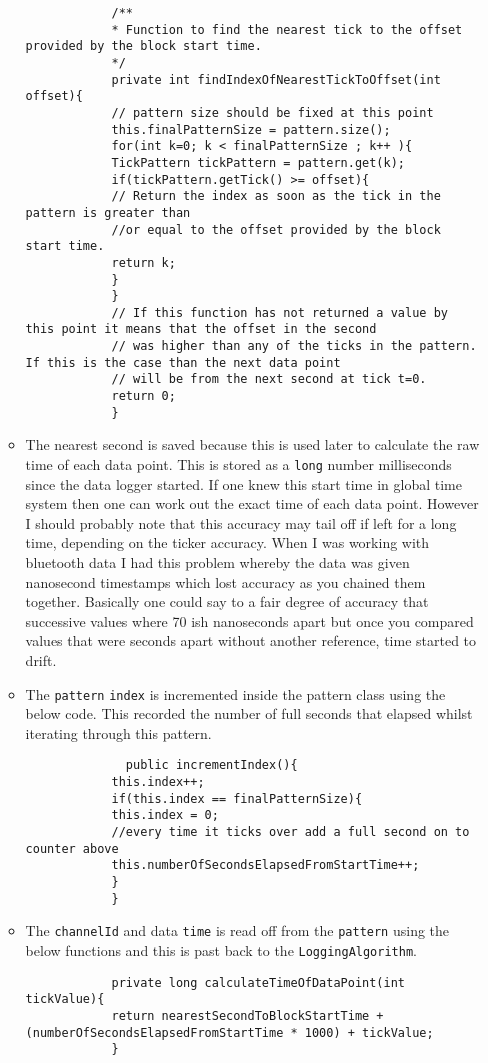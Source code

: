 \documentclass{article}
\begin{document}
\begin{itemize}
\begin{itemize}
\begin{lstlisting}
			/**
			* Function to find the nearest tick to the offset provided by the block start time.
			*/
			private int findIndexOfNearestTickToOffset(int offset){
			// pattern size should be fixed at this point
			this.finalPatternSize = pattern.size();
			for(int k=0; k < finalPatternSize ; k++ ){
			TickPattern tickPattern = pattern.get(k);
			if(tickPattern.getTick() >= offset){
			// Return the index as soon as the tick in the pattern is greater than 
			//or equal to the offset provided by the block start time.
			return k;
			}
			}
			// If this function has not returned a value by this point it means that the offset in the second
			// was higher than any of the ticks in the pattern. If this is the case than the next data point
			// will be from the next second at tick t=0.
			return 0;
			}
			\end{lstlisting}			
			\item The nearest second is saved because this is used later to calculate the raw time of each data point. This is stored as a \texttt{long} number milliseconds since the data logger started. If one knew this start time in global time system then one can work out the exact time of each data point. However I should probably note that this accuracy may tail off if left for a long time, depending on the ticker accuracy. When I was working with bluetooth data I had this problem whereby the data was given nanosecond timestamps which lost accuracy as you chained them together. Basically one could say to a fair degree of accuracy that successive values where 70 ish nanoseconds apart but once you compared values that were seconds apart without another reference, time started to drift.
			\item The \texttt{pattern} \texttt{index} is incremented inside the pattern class using the below code. This recorded the number of full seconds that elapsed whilst iterating through this pattern.
			\begin{lstlisting}
			  public incrementIndex(){
			this.index++;
			if(this.index == finalPatternSize){
			this.index = 0;
			//every time it ticks over add a full second on to counter above
			this.numberOfSecondsElapsedFromStartTime++;
			}
			}
			\end{lstlisting}
			\item The \texttt{channelId} and data \texttt{time} is read off from the \texttt{pattern} using the below functions and this is past back to the \texttt{LoggingAlgorithm}.
			\begin{lstlisting}
			private long calculateTimeOfDataPoint(int tickValue){
			return nearestSecondToBlockStartTime + (numberOfSecondsElapsedFromStartTime * 1000) + tickValue;
			}
			

\end{lstlisting}
\end{itemize}
\end{itemize}
\end{document}
